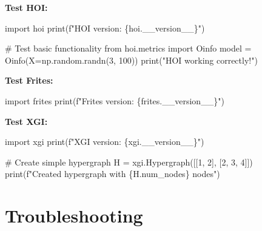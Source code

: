 \documentclass[
  11pt,
  letterpaper,
  oneside,
  openany]{book}
\newenvironment{Shaded}{\begin{snugshade}}{\end{snugshade}}
\newcommand{\BuiltInTok}[1]{\textcolor[rgb]{0.00,0.23,0.31}{#1}}
\newcommand{\CommentTok}[1]{\textcolor[rgb]{0.37,0.37,0.37}{#1}}
\newcommand{\DecValTok}[1]{\textcolor[rgb]{0.68,0.00,0.00}{#1}}
\newcommand{\ImportTok}[1]{\textcolor[rgb]{0.00,0.46,0.62}{#1}}
\newcommand{\NormalTok}[1]{\textcolor[rgb]{0.00,0.23,0.31}{#1}}
\newcommand{\OperatorTok}[1]{\textcolor[rgb]{0.37,0.37,0.37}{#1}}
\newcommand{\SpecialCharTok}[1]{\textcolor[rgb]{0.37,0.37,0.37}{#1}}
\newcommand{\SpecialStringTok}[1]{\textcolor[rgb]{0.13,0.47,0.30}{#1}}
\newcommand{\StringTok}[1]{\textcolor[rgb]{0.13,0.47,0.30}{#1}}
\begin{document}
\textbf{Test HOI:}

\begin{Shaded}
\begin{Highlighting}[]
\ImportTok{import}\NormalTok{ hoi}
\BuiltInTok{print}\NormalTok{(}\SpecialStringTok{f"HOI version: }\SpecialCharTok{\{}\NormalTok{hoi}\SpecialCharTok{.}\NormalTok{\_\_version\_\_}\SpecialCharTok{\}}\SpecialStringTok{"}\NormalTok{)}

\CommentTok{\# Test basic functionality}
\ImportTok{from}\NormalTok{ hoi.metrics }\ImportTok{import}\NormalTok{ Oinfo}
\NormalTok{model }\OperatorTok{=}\NormalTok{ Oinfo(X}\OperatorTok{=}\NormalTok{np.random.randn(}\DecValTok{3}\NormalTok{, }\DecValTok{100}\NormalTok{))}
\BuiltInTok{print}\NormalTok{(}\StringTok{"HOI working correctly!"}\NormalTok{)}
\end{Highlighting}
\end{Shaded}

\textbf{Test Frites:}

\begin{Shaded}
\begin{Highlighting}[]
\ImportTok{import}\NormalTok{ frites}
\BuiltInTok{print}\NormalTok{(}\SpecialStringTok{f"Frites version: }\SpecialCharTok{\{}\NormalTok{frites}\SpecialCharTok{.}\NormalTok{\_\_version\_\_}\SpecialCharTok{\}}\SpecialStringTok{"}\NormalTok{)}
\end{Highlighting}
\end{Shaded}

\textbf{Test XGI:}

\begin{Shaded}
\begin{Highlighting}[]
\ImportTok{import}\NormalTok{ xgi}
\BuiltInTok{print}\NormalTok{(}\SpecialStringTok{f"XGI version: }\SpecialCharTok{\{}\NormalTok{xgi}\SpecialCharTok{.}\NormalTok{\_\_version\_\_}\SpecialCharTok{\}}\SpecialStringTok{"}\NormalTok{)}

\CommentTok{\# Create simple hypergraph}
\NormalTok{H }\OperatorTok{=}\NormalTok{ xgi.Hypergraph([[}\DecValTok{1}\NormalTok{, }\DecValTok{2}\NormalTok{], [}\DecValTok{2}\NormalTok{, }\DecValTok{3}\NormalTok{, }\DecValTok{4}\NormalTok{]])}
\BuiltInTok{print}\NormalTok{(}\SpecialStringTok{f"Created hypergraph with }\SpecialCharTok{\{}\NormalTok{H}\SpecialCharTok{.}\NormalTok{num\_nodes}\SpecialCharTok{\}}\SpecialStringTok{ nodes"}\NormalTok{)}
\end{Highlighting}
\end{Shaded}

\section*{Troubleshooting}\label{troubleshooting-2}
\end{document}
